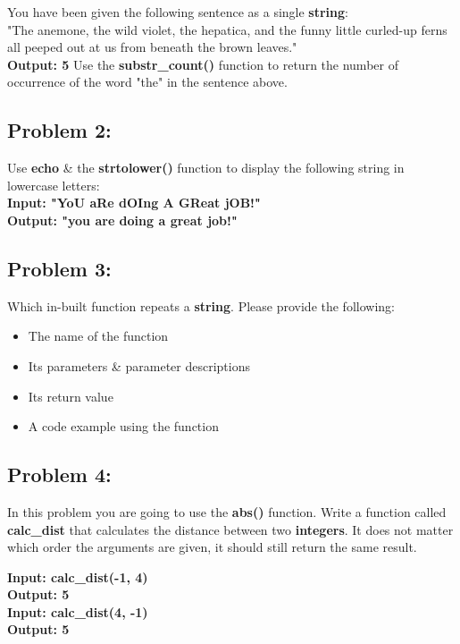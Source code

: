 \documentclass{article}
\begin{document}
You have been given the following sentence as a single \textbf{string}: \\

"The anemone, the wild violet, the hepatica, and the funny little curled-up ferns all peeped out at us from beneath the brown leaves." \\

\textbf{Output: 5} 
Use the \textbf{substr\_count()} function to return the number of occurrence of the word "the" in the sentence above.

\subsection{Problem 2:}
Use \textbf{echo} \& the \textbf{strtolower()} function to display the following string in lowercase letters: \\

\textbf{Input: "YoU aRe dOIng A GReat jOB!"} \\
\textbf{Output: "you are doing a great job!"}

\subsection{Problem 3:}
Which in-built function repeats a \textbf{string}. Please provide the following:
\begin{itemize}
    \item The name of the function
    \item Its parameters \& parameter descriptions
    \item Its return value
    \item A code example using the function
\end{itemize}

\subsection{Problem 4:}
In this problem you are going to use the \textbf{abs()} function. Write a function called \textbf{calc\_dist} that calculates the distance between two \textbf{integers}. It does not matter which order the arguments are given, it should still return the same result. 

\textbf{Input: calc\_dist(-1, 4)} \\
\textbf{Output: 5} \\

\textbf{Input: calc\_dist(4, -1)} \\
\textbf{Output: 5} 
\end{document}
